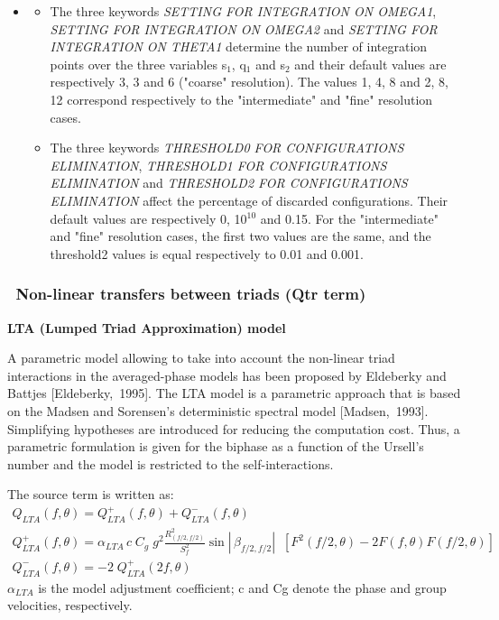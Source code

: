 \begin{itemize}
\item \begin{itemize}
\item  The three keywords \textit{SETTING FOR INTEGRATION ON OMEGA1}, \textit{SETTING FOR INTEGRATION ON OMEGA2} and \textit{SETTING FOR INTEGRATION ON THETA1} determine the number of integration points over the three variables s${}_{1}$, q${}_{1}$ and s${}_{2}$ and their default values are respectively 3, 3 and 6 ("coarse" resolution). The values 1, 4, 8 and 2, 8, 12 correspond respectively to the "intermediate" and "fine" resolution cases.

\item  The three keywords \textit{THRESHOLD0 FOR CONFIGURATIONS ELIMINATION}, \textit{THRESHOLD1 FOR CONFIGURATIONS ELIMINATION} and \textit{THRESHOLD2 FOR CONFIGURATIONS ELIMINATION} affect the percentage of discarded configurations. Their default values are respectively 0, 10${}^{10}$ and 0.15. For the "intermediate" and "fine" resolution cases, the first two values are the same, and the threshold2 values is equal respectively to 0.01 and 0.001.
\end{itemize}
\end{itemize}


\subsubsection{ ~Non-linear transfers between triads (Qtr term)}


{\bf  LTA (Lumped Triad Approximation) model}

 A parametric model allowing to take into account the non-linear triad interactions in the averaged-phase models has been proposed by Eldeberky and Battjes [Eldeberky,~1995]. The LTA model is a parametric approach that is based on the Madsen and Sorensen's deterministic spectral model [Madsen,~1993]. Simplifying hypotheses are introduced for reducing the computation cost. Thus, a parametric formulation is given for the biphase as a function of the Ursell's number and the model is restricted to the self-interactions.

 The source term is written as:
\begin{equation} \label{GrindEQ__4_63_}
\begin{array}{l} {Q_{LTA} (f,\theta )=Q_{LTA}^{+} (f,\theta )+Q_{LTA}^{-} (f,\theta )} \\ {Q_{LTA}^{+} (f,\theta )=\alpha _{LTA} \, c\; C_{g} \; g^{2} \frac{R_{(f/2,f/2)}^{2} }{S_{f}^{2} } \sin \left|\, \beta _{f/2,f/2} \right|\; \; \left[F^{2} (f/2,\theta )-2F(f,\theta )F(f/2,\theta )\right]} \\ {Q_{LTA}^{-} (f,\theta )=-2\; Q_{LTA}^{+} (2f,\theta )} \end{array}
\end{equation}
$\alpha _{LTA} $ is the model adjustment coefficient; c and Cg denote the phase and group velocities, respectively.


